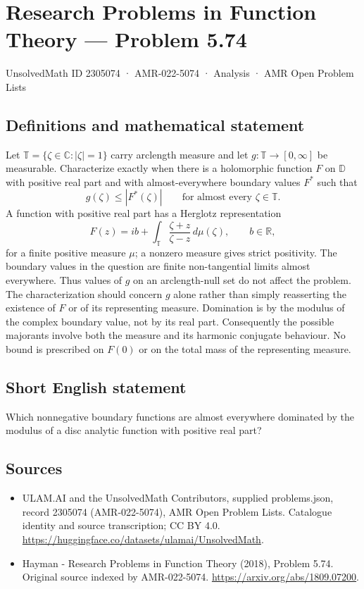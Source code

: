 \documentclass[11pt,a4paper]{article}
\begin{document}
\section*{Research Problems in Function Theory — Problem 5.74}\label{2305074}
{\small UnsolvedMath ID 2305074 · AMR-022-5074 · Analysis · AMR Open Problem Lists}
\subsection{Definitions and mathematical statement}
Let $\mathbb T=\{\zeta\in\mathbb C:|\zeta|=1\}$ carry arclength measure and let $g:\mathbb T\to[0,\infty]$ be measurable. Characterize exactly when there is a holomorphic function $F$ on $\mathbb D$ with positive real part and with almost-everywhere boundary values $F^*$ such that
\[
g(\zeta)\le|F^*(\zeta)|\qquad\text{for almost every }\zeta\in\mathbb T.
\]
A function with positive real part has a Herglotz representation
\[
F(z)=ib+\int_{\mathbb T}\frac{\zeta+z}{\zeta-z}\,d\mu(\zeta),
\qquad b\in\mathbb R,
\]
for a finite positive measure $\mu$; a nonzero measure gives strict positivity. The boundary values in the question are finite non-tangential limits almost everywhere. Thus values of $g$ on an arclength-null set do not affect the problem.
The characterization should concern $g$ alone rather than simply reasserting the existence of $F$ or of its representing measure. Domination is by the modulus of the complex boundary value, not by its real part. Consequently the possible majorants involve both the measure and its harmonic conjugate behaviour. No bound is prescribed on $F(0)$ or on the total mass of the representing measure.
\subsection{Short English statement}
Which nonnegative boundary functions are almost everywhere dominated by the modulus of a disc analytic function with positive real part?
\subsection{Sources}
\begin{itemize}
\item[S1] ULAM.AI and the UnsolvedMath Contributors, supplied problems.json, record 2305074 (AMR-022-5074), AMR Open Problem Lists. Catalogue identity and source transcription; CC BY 4.0.
\url{https://huggingface.co/datasets/ulamai/UnsolvedMath}.
\item[S2] Hayman - Research Problems in Function Theory (2018), Problem 5.74. Original source indexed by AMR-022-5074.
\url{https://arxiv.org/abs/1809.07200}.
\end{itemize}
\end{document}
